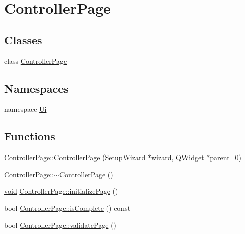 \hypertarget{group___controller_page}{\section{\-Controller\-Page}
\label{group___controller_page}
}
\subsection*{\-Classes}
\begin{DoxyCompactItemize}
\item 
class \hyperlink{class_controller_page}{\-Controller\-Page}
\end{DoxyCompactItemize}
\subsection*{\-Namespaces}
\begin{DoxyCompactItemize}
\item 
namespace \hyperlink{namespace_ui}{\-Ui}
\end{DoxyCompactItemize}
\subsection*{\-Functions}
\begin{DoxyCompactItemize}
\item 
\hyperlink{group___controller_page_ga82de0473ed3c57a5a89736525b0336f2}{\-Controller\-Page\-::\-Controller\-Page} (\hyperlink{class_setup_wizard}{\-Setup\-Wizard} $\ast$wizard, \-Q\-Widget $\ast$parent=0)
\item 
\hyperlink{group___controller_page_ga5573a5d2568f7e15528658e32de887d3}{\-Controller\-Page\-::$\sim$\-Controller\-Page} ()
\item 
\hyperlink{group___u_a_v_objects_plugin_ga444cf2ff3f0ecbe028adce838d373f5c}{void} \hyperlink{group___controller_page_gaf9c2ad04637cf0961bd7bb5d5d5200c4}{\-Controller\-Page\-::initialize\-Page} ()
\item 
bool \hyperlink{group___controller_page_gae5ede361df9cdf86bf53ce39ef72267c}{\-Controller\-Page\-::is\-Complete} () const 
\item 
bool \hyperlink{group___controller_page_ga91bcb88db666a8d5585553520d1247b9}{\-Controller\-Page\-::validate\-Page} ()
\end{DoxyCompactItemize}


